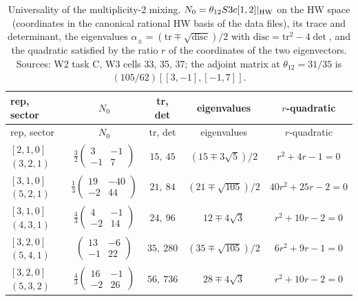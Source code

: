 \documentclass[11pt]{article}
\begin{document}
{\small
\begin{longtable}{lcccc}
\caption{Universality of the multiplicity-2 mixing. $N_0=\theta_{12}S3c[1,2]|_{\rm HW}$ on the HW space (coordinates in the canonical rational HW basis of the data files), its trace and determinant, the eigenvalues $\alpha_\pm=(\mathrm{tr}\mp\sqrt{\mathrm{disc}})/2$ with $\mathrm{disc}=\mathrm{tr}^2-4\det$, and the quadratic satisfied by the ratio $r$ of the coordinates of the two eigenvectors.
Sources: W2 task C, W3 cells 33, 35, 37; the adjoint matrix at $\theta_{12}=31/35$ is $(105/62)[[3,-1],[-1,7]]$.}\label{tab:univ}\\
\toprule
rep, sector & $N_0$ & tr, det & eigenvalues & $r$-quadratic \\
\midrule
\endfirsthead
\toprule
rep, sector & $N_0$ & tr, det & eigenvalues & $r$-quadratic \\
\midrule
\endhead
\bottomrule
\endlastfoot
$[2,1,0]$ $(3,2,1)$ & $\tfrac32\begin{pmatrix}3&-1\\-1&7\end{pmatrix}$ & $15,\ 45$ & $(15\mp3\sqrt5)/2$ & $r^2+4r-1=0$ \\
$[3,1,0]$ $(5,2,1)$ & $\tfrac13\begin{pmatrix}19&-40\\-2&44\end{pmatrix}$ & $21,\ 84$ & $(21\mp\sqrt{105})/2$ & $40r^2+25r-2=0$ \\
$[3,1,0]$ $(4,3,1)$ & $\tfrac43\begin{pmatrix}4&-1\\-2&14\end{pmatrix}$ & $24,\ 96$ & $12\mp4\sqrt3$ & $r^2+10r-2=0$ \\
$[3,2,0]$ $(5,4,1)$ & $\begin{pmatrix}13&-6\\-1&22\end{pmatrix}$ & $35,\ 280$ & $(35\mp\sqrt{105})/2$ & $6r^2+9r-1=0$ \\
$[3,2,0]$ $(5,3,2)$ & $\tfrac43\begin{pmatrix}16&-1\\-2&26\end{pmatrix}$ & $56,\ 736$ & $28\mp4\sqrt3$ & $r^2+10r-2=0$ \\
\end{longtable}}
\end{document}

